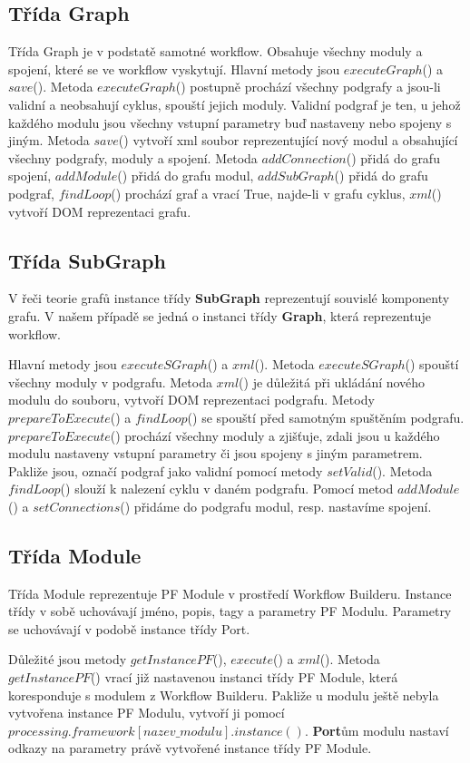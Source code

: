 \subsection*{Třída Graph}
Třída Graph je v podstatě samotné workflow. Obsahuje všechny moduly a spojení, které se ve workflow vyskytují. Hlavní metody jsou $executeGraph$() a $save$(). Metoda $executeGraph$() postupně prochází všechny podgrafy a jsou-li validní a neobsahují cyklus, spouští jejich moduly. Validní podgraf je ten, u jehož každého modulu jsou všechny vstupní parametry buď nastaveny nebo spojeny s jiným. Metoda $save$() vytvoří xml soubor reprezentující nový modul a obsahující všechny podgrafy, moduly a spojení. Metoda $addConnection$() přidá do grafu spojení, $addModule$() přidá do grafu modul, $addSubGraph$() přidá do grafu podgraf, $findLoop$() prochází graf a vrací True, najde-li v grafu cyklus, $xml$() vytvoří DOM reprezentaci grafu.

\subsection*{Třída SubGraph}
V řeči teorie grafů instance třídy \textbf{SubGraph} reprezentují souvislé komponenty grafu. V našem případě se jedná o instanci třídy \textbf{Graph}, která reprezentuje workflow.

Hlavní metody jsou $executeSGraph$() a $xml$(). Metoda $executeSGraph$() spouští všechny moduly v podgrafu. Metoda $xml$() je důležitá při ukládání nového modulu do souboru, vytvoří DOM reprezentaci podgrafu. Metody $prepareToExecute$() a $findLoop$() se spouští před samotným spuštěním podgrafu. $prepareToExecute$() prochází všechny moduly a zjišťuje, zdali jsou u každého modulu nastaveny vstupní parametry či jsou spojeny s jiným parametrem. Pakliže jsou, označí podgraf jako validní pomocí metody $setValid$(). Metoda $findLoop$() slouží k nalezení cyklu v daném podgrafu. 
Pomocí metod $addModule$() a $setConnections$() přidáme do podgrafu modul, resp. nastavíme spojení.

\subsection*{Třída Module}
Třída Module reprezentuje PF Module v prostředí Workflow Builderu. Instance třídy v sobě uchovávají jméno, popis, tagy a parametry PF Modulu. Parametry se uchovávají v podobě instance třídy Port. 

Důležité jsou metody $getInstancePF$(), $execute$() a $xml$(). Metoda $getInstancePF$() vrací již nastavenou instanci třídy PF Module, která koresponduje s modulem z Workflow Builderu. Pakliže u modulu ještě nebyla vytvořena instance PF Modulu, vytvoří ji pomocí $processing.framework[nazev\_modulu].instance()$. \textbf{Port}ům modulu nastaví odkazy na parametry právě vytvořené instance třídy PF Module. 

